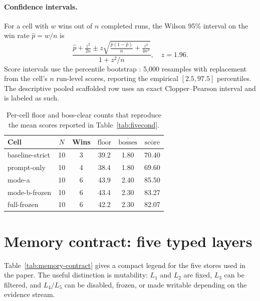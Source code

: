 \paragraph{Confidence intervals.}
For a cell with $w$ wins out of $n$ completed runs, the Wilson 95\%
interval \citep{wilson1927} on the win rate $\hat p = w/n$ is
\begin{equation}
\frac{\hat p + \tfrac{z^2}{2n} \pm z\sqrt{\tfrac{\hat p(1-\hat p)}{n} + \tfrac{z^2}{4n^2}}}{1 + z^2/n},
\quad z=1.96.
\label{eq:wilson}
\end{equation}
Score intervals use the percentile bootstrap \citep{efron1979}: 5{,}000
resamples with replacement from the cell's $n$ run-level scores,
reporting the empirical $[2.5,97.5]$ percentiles. The descriptive
pooled scaffolded row uses an exact Clopper--Pearson interval and is
labeled as such.

\begin{table}[H]
\centering\footnotesize
\caption{Per-cell floor and boss-clear counts that reproduce the
mean scores reported in Table~\ref{tab:fivecond}.}
\label{tab:cell-floor-boss}
\setlength{\tabcolsep}{4pt}
\renewcommand{\arraystretch}{1.05}
\begin{tabular*}{\columnwidth}{@{\extracolsep{\fill}}lccccc@{}}
\toprule
Cell & $N$ & Wins & $\overline{\mathrm{floor}}$ & $\overline{\mathrm{bosses}}$ & $\overline{\mathrm{score}}$ \\
\midrule
baseline-strict & 10 & 3 & 39.2 & 1.80 & 70.40 \\
prompt-only     & 10 & 4 & 38.4 & 1.80 & 69.60 \\
mode-a          & 10 & 6 & 43.9 & 2.40 & 85.50 \\
mode-b-frozen   & 10 & 6 & 43.4 & 2.30 & 83.27 \\
full-frozen     & 10 & 6 & 42.2 & 2.30 & 82.07 \\
\bottomrule
\end{tabular*}
\end{table}
\FloatBarrier

\section{Memory contract: five typed layers}
\label{app:memory-contract}

Table~\ref{tab:memory-contract} gives a compact legend for the five
stores used in the paper. The useful distinction is mutability:
$L_1$ and $L_2$ are fixed, $L_3$ can be filtered, and $L_4/L_5$ can be
disabled, frozen, or made writable depending on the evidence stream.

